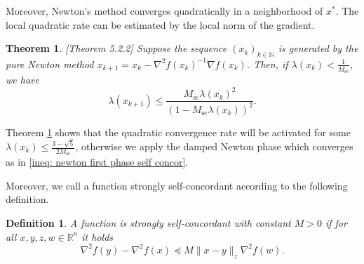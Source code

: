 \documentclass[sn-mathphys-num]{sn-jnl}%
\newcommand{\R}{\mathbb{R}}
\newcommand{\N}{\mathbb{N}}
\theoremstyle{thmstyleone}%
\newtheorem{theorem}{Theorem}[section]%
\theoremstyle{thmstyletwo}%
\theoremstyle{thmstylethree}%
\newtheorem{definition}{Definition}[section]%
\numberwithin{equation}{section}
\begin{document}
Moreover, Newton's method converges quadratically in a neighborhood of $x^*$. The local quadratic rate can be estimated by the local norm of the gradient.
\begin{theorem} \cite{nesterov2018lectures}[Theorem 5.2.2] \label{thm: newton quadratic phase self concor}
Suppose the sequence $(x_k)_{k \in \N}$ is generated by the pure Newton method $ x_{k+1} = x_k - \nabla^2 f (x_k)^{-1} \nabla f (x_k)$. Then, if $\lambda(x_k) < \frac{1}{M_\text{sc}}$, we have
\begin{equation} \label{ineq: newton quadratic phase self concor with Msc}
\lambda(x_{k+1}) \leq \frac{M_\text{sc} \lambda(x_{k})^2}{\left( 1-M_\text{sc}\lambda(x_{k})\right)^2}.
\end{equation}
\end{theorem}
Theorem \ref{thm: newton quadratic phase self concor} shows that the quadratic convergence rate will be activated for some $\lambda(x_{k}) \leq \frac{3 - \sqrt{5}}{2M_\text{sc}}$, otherwise we apply the damped Newton phase which converges as in \eqref{ineq: newton first phase self concor}.

Moreover, we call a function strongly self-concordant according to the following definition.
\begin{definition} \label{def: strongly self concordance}
        A function is strongly self-concordant with constant $M>0$ if for all $x,y,z,w \in \R^n$ it holds
    \begin{equation}
        \nabla^2f(y) - \nabla^2f(x) \preceq M \|x-y\|_z \nabla^2f(w). \label{ineq: strong self conc}
    \end{equation}
\end{definition}
\end{document}
